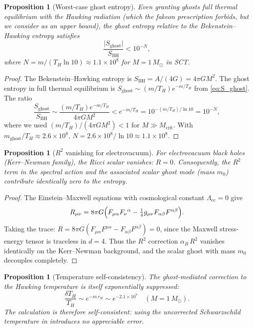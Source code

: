 \documentclass[11pt,a4paper]{article}
\newcommand{\Msun}{M_{\odot}}
\newcommand{\Mcrit}{M_{\mathrm{crit}}}
\newcommand{\mghost}{m_{\mathrm{ghost}}}
\newcommand{\Thr}{T_{\!\scriptscriptstyle H}}
\theoremstyle{plain}
\newtheorem{proposition}[theorem]{Proposition}
\theoremstyle{definition}
\begin{document}
\begin{proposition}[Worst-case ghost entropy]\label{prop:entropy_bound}
  Even granting ghosts full thermal equilibrium with the Hawking
  radiation (which the fakeon prescription forbids, but we consider as
  an upper bound), the ghost entropy relative to the Bekenstein--Hawking
  entropy satisfies
  \begin{equation}\label{eq:Sghost_SBH}
    \frac{\lvert S_{\mathrm{ghost}}\rvert}{S_{\mathrm{BH}}}
    < 10^{-N},
  \end{equation}
  where $N = m/(T_H\ln 10) \approx 1.1\times 10^{8}$ for
  $M = 1\,\Msun$ in SCT.
\end{proposition}

\begin{proof}
  The Bekenstein--Hawking entropy is
  $S_{\mathrm{BH}} = A/(4G) = 4\pi G M^2$.  The ghost entropy in
  full thermal equilibrium is $S_{\mathrm{ghost}} \sim (m/T_H)e^{-m/T_H}$
  from \eqref{eq:S_ghost}.  The ratio
  \[
    \frac{S_{\mathrm{ghost}}}{S_{\mathrm{BH}}}
    \sim \frac{(m/T_H)e^{-m/T_H}}{4\pi GM^2}
    < e^{-m/T_H}
    = 10^{-(m/T_H)/\ln 10}
    = 10^{-N},
  \]
  where we used $(m/T_H)/(4\pi GM^2) < 1$ for $M \gg \Mcrit$.
  With $\mghost/T_H \approx 2.6\times 10^{8}$,
  $N = 2.6\times 10^{8}/\ln 10 \approx 1.1\times 10^{8}$.
\end{proof}

\begin{proposition}[$R^2$ vanishing for electrovacuum]%
\label{prop:R2_electrovac}
  For electrovacuum black holes (Kerr--Newman family), the Ricci
  scalar vanishes: $R = 0$.  Consequently, the $R^2$ term in the
  spectral action and the associated scalar ghost mode (mass $m_0$)
  contribute identically zero to the entropy.
\end{proposition}

\begin{proof}
  The Einstein--Maxwell equations with cosmological constant
  $\Lambda_{\mathrm{cc}} = 0$ give
  \[
    R_{\mu\nu} = 8\pi G\Bigl(F_{\mu\alpha}F_\nu{}^\alpha
    - \tfrac{1}{4}g_{\mu\nu}F_{\alpha\beta}F^{\alpha\beta}\Bigr).
  \]
  Taking the trace:
  $R = 8\pi G(F_{\mu\alpha}F^{\mu\alpha}
  - F_{\alpha\beta}F^{\alpha\beta}) = 0$,
  since the Maxwell stress-energy tensor is traceless in $d=4$.  Thus
  the $R^2$ correction $\alpha_R\, R^2$ vanishes identically on the
  Kerr--Newman background, and the scalar ghost with mass $m_0$
  decouples completely.
\end{proof}

\begin{proposition}[Temperature self-consistency]\label{prop:self_consistent}
  The ghost-mediated correction to the Hawking temperature is itself
  exponentially suppressed:
  \begin{equation}\label{eq:dT_correction}
    \frac{\delta \Thr}{\Thr}
    \sim e^{-m\,r_H}
    \sim e^{-2.1\times 10^{7}}\quad (M = 1\,\Msun).
  \end{equation}
  The calculation is therefore self-consistent: using the uncorrected
  Schwarzschild temperature in  introduces no
  appreciable error.
\end{proposition}
\end{document}
